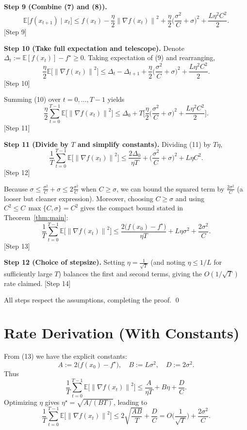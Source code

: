\documentclass[11pt]{article}
\newcommand{\EE}{\mathbb{E}}
\newcommand{\norm}[1]{\left\lVert#1\right\rVert}
\begin{document}
\noindent\textbf{Step 9 (Combine (7) and (8)).}  
\[
\EE\big[f(x_{t+1})\mid x_t\big]
\le f(x_t)-\frac{\eta}{2}\norm{\nabla f(x_t)}^2
+\frac{\eta}{2}\Big(\frac{\sigma^2}{C}+\sigma\Big)^2
+\frac{L\eta^2 C^2}{2}.
\tag{9}
\] \hfill[Step 9]

\noindent\textbf{Step 10 (Take full expectation and telescope).}  
Denote $\Delta_t:=\EE[f(x_t)]-f^\star\ge0$.
Taking expectation of (9) and rearranging,
\[
\frac{\eta}{2}\EE\!\big[\norm{\nabla f(x_t)}^2\big]
\le \Delta_t-\Delta_{t+1}
+\frac{\eta}{2}\Big(\frac{\sigma^2}{C}+\sigma\Big)^2
+\frac{L\eta^2 C^2}{2}.
\tag{10}
\] \hfill[Step 10]

Summing (10) over $t=0,\dots,T-1$ yields
\[
\frac{\eta}{2}\sum_{t=0}^{T-1}\EE\!\big[\norm{\nabla f(x_t)}^2\big]
\le \Delta_0
+T\Big[\frac{\eta}{2}\Big(\frac{\sigma^2}{C}+\sigma\Big)^2
+\frac{L\eta^2 C^2}{2}\Big].
\tag{11}
\] \hfill[Step 11]

\noindent\textbf{Step 11 (Divide by $T$ and simplify constants).}  
Dividing (11) by $T\eta$,
\[
\frac{1}{T}\sum_{t=0}^{T-1}\EE\!\big[\norm{\nabla f(x_t)}^2\big]
\le \frac{2\Delta_0}{\eta T}
+\Big(\frac{\sigma^2}{C}+\sigma\Big)^2
+L\eta C^2 .
\tag{12}
\] \hfill[Step 12]

Because $\sigma\le \frac{\sigma^2}{C}+ \sigma \le 2\frac{\sigma^2}{C}$ when $C\ge\sigma$, we can bound the squared term by $\frac{2\sigma^2}{C}$ (a looser but cleaner expression). Moreover, choosing $C\ge\sigma$ and using $C^2\le C\,\max\{C,\sigma\}=C^2$ gives the compact bound stated in Theorem~\ref{thm:main}:
\[
\frac{1}{T}\sum_{t=0}^{T-1}\EE\!\big[\norm{\nabla f(x_t)}^2\big]
\le \frac{2\big(f(x_0)-f^\star\big)}{\eta T}
+L\eta\sigma^2
+\frac{2\sigma^2}{C}.
\] \hfill[Step 13]

\noindent\textbf{Step 12 (Choice of stepsize).}  
Setting $\eta = \frac{1}{\sqrt{T}}$ (and noting $\eta\le 1/L$ for sufficiently large $T$) balances the first and second terms, giving the $O(1/\sqrt{T})$ rate claimed. \hfill[Step 14]

All steps respect the assumptions, completing the proof. \qed

\section*{Rate Derivation (With Constants)}
From (13) we have the explicit constants:
\[
A:=2\big(f(x_0)-f^\star\big),\quad
B:=L\sigma^2,\quad
D:=2\sigma^2.
\]
Thus
\[
\frac{1}{T}\sum_{t=0}^{T-1}\EE\!\big[\norm{\nabla f(x_t)}^2\big]
\le \frac{A}{\eta T}+B\eta+\frac{D}{C}.
\]
Optimizing $\eta$ gives $\eta^\star=\sqrt{A/(BT)}$, leading to
\[
\frac{1}{T}\sum_{t=0}^{T-1}\EE\!\big[\norm{\nabla f(x_t)}^2\big]
\le 2\sqrt{\frac{AB}{T}}+\frac{D}{C}
= O\!\Big(\frac{1}{\sqrt{T}}\Big)+\frac{2\sigma^2}{C}.
\]
\end{document}
